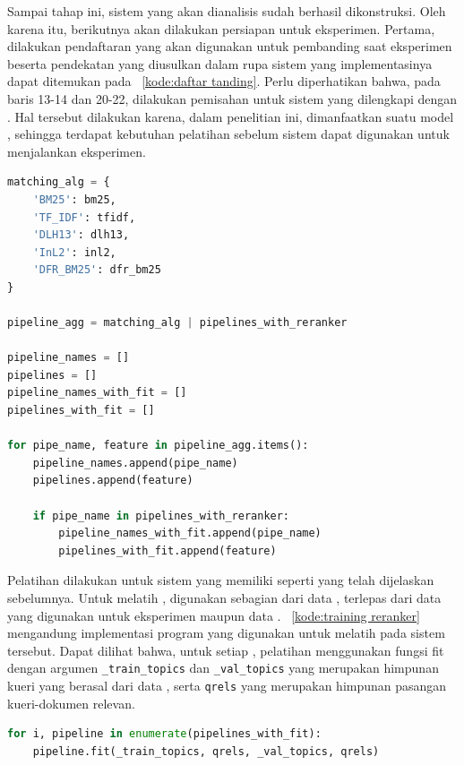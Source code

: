 Sampai tahap ini, sistem \ir{} yang akan dianalisis sudah berhasil dikonstruksi. Oleh karena itu, berikutnya akan dilakukan persiapan untuk eksperimen. Pertama, dilakukan pendaftaran \base{} \retriever{} yang akan digunakan untuk pembanding saat eksperimen beserta pendekatan yang diusulkan dalam rupa sistem \ir{} yang implementasinya dapat ditemukan pada \kode{}~\ref{kode:daftar tanding}. Perlu diperhatikan bahwa, pada baris 13-14 dan 20-22, dilakukan pemisahan untuk sistem yang dilengkapi dengan \reranker{}. Hal tersebut dilakukan karena, dalam penelitian ini, dimanfaatkan suatu model \ml{}, sehingga terdapat kebutuhan pelatihan sebelum sistem dapat digunakan untuk menjalankan eksperimen.
\begin{lstlisting}[language=Python, caption={Pendaftaran model untuk eksperimen}, label={kode:daftar tanding}]
matching_alg = {
    'BM25': bm25,
    'TF_IDF': tfidf,
    'DLH13': dlh13,
    'InL2': inl2,
    'DFR_BM25': dfr_bm25
}

pipeline_agg = matching_alg | pipelines_with_reranker

pipeline_names = []
pipelines = []
pipeline_names_with_fit = []
pipelines_with_fit = []

for pipe_name, feature in pipeline_agg.items():
    pipeline_names.append(pipe_name)
    pipelines.append(feature)

    if pipe_name in pipelines_with_reranker:
        pipeline_names_with_fit.append(pipe_name)
        pipelines_with_fit.append(feature)
\end{lstlisting}

Pelatihan dilakukan untuk sistem yang memiliki \pipeline{} \reranker{} seperti yang telah dijelaskan sebelumnya. Untuk melatih \lambdamart{}, digunakan sebagian dari data \training{}, terlepas dari data yang digunakan untuk eksperimen maupun data \testing{}. \kode{}~\ref{kode:training reranker} mengandung implementasi program yang digunakan untuk melatih \reranker{} pada sistem \ir{} tersebut. Dapat dilihat bahwa, untuk setiap \pipeline{}, pelatihan menggunakan fungsi fit dengan argumen \lstinline{_train_topics} dan \lstinline{_val_topics} yang merupakan himpunan kueri yang berasal dari data \training{}, serta \lstinline{qrels} yang merupakan himpunan pasangan kueri-dokumen relevan.
\begin{lstlisting}[language=Python, caption={Pelatihan model \reranker{}}, label={kode:training reranker}]
for i, pipeline in enumerate(pipelines_with_fit):
    pipeline.fit(_train_topics, qrels, _val_topics, qrels)
\end{lstlisting}


